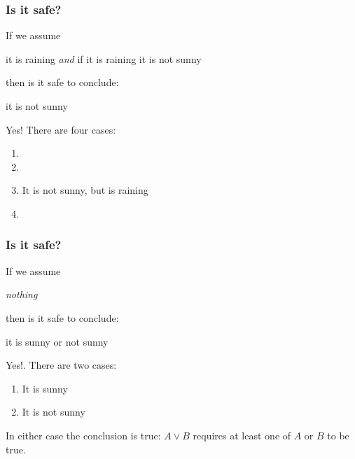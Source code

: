\documentclass[xetex,aspectratio=169,14pt,hyperref={pdfpagelabels=true,pdflang={en-GB}}]{beamer}
\begin{document}
\begin{frame}[t]
  \frametitle{Is it safe?}

  If we assume
  \begin{center}
    it is raining \qquad \emph{and} \qquad if it is raining it is not sunny
  \end{center}
  then is it safe to conclude:
  \begin{center}
    it is not sunny
  \end{center}

  \bigskip
  \pause

  Yes! \pause There are four cases:
  \begin{enumerate}
  \item {}
  \item {}
  \item It is not sunny, but is raining
  \item {}
  \end{enumerate}
  \pause %
\end{frame}

\begin{frame}[t]
  \frametitle{Is it safe?}

  If we assume
  \begin{center}
    \emph{nothing}
  \end{center}
  then is it safe to conclude:
  \begin{center}
    it is sunny or not sunny
  \end{center}

  \pause
  \bigskip

  Yes!. There are two cases:
  \begin{enumerate}
  \item It is sunny
  \item It is not sunny
  \end{enumerate}
  \pause In either case the conclusion is true: $A \lor B$ requires at
  least one of $A$ or $B$ to be true.
\end{frame}
\end{document}
